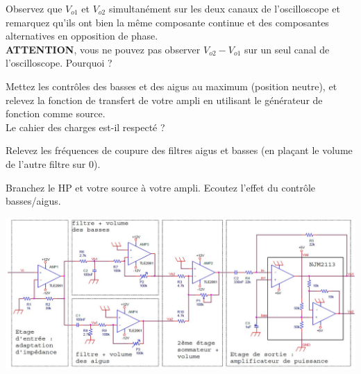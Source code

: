 \documentclass{../template/labo}
\begin{document}
\Question
{
Observez que $V_{o1}$ et $V_{o2}$ simultanément sur les deux canaux de l'oscilloscope et remarquez qu'ils ont bien la même composante continue et des composantes alternatives en opposition de phase.\\
\textbf{ATTENTION}, vous ne pouvez pas observer $V_{o2} - V_{o1}$ sur un seul canal de l'oscilloscope. Pourquoi ?
}
{}

\Question
{
Mettez les contrôles des basses et des aigus au maximum (position neutre), et relevez la fonction de transfert de votre ampli en utilisant le générateur de fonction comme source.\\
Le cahier des charges est-il respecté ?
}
{}

\Question
{
Relevez les fréquences de coupure des filtres aigus et basses (en plaçant le volume de l'autre filtre sur $0$).
}
{}

\Question
{
Branchez le HP et votre source à votre ampli. Ecoutez l'effet du contrôle basses/aigus.
}
{}

\begin{center}
\includegraphics[width=26cm, angle=90]{figures/AOPmontagetotal}
\end{center}
\end{document}
